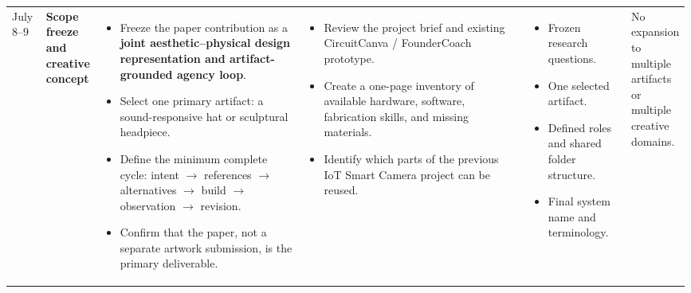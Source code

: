 \documentclass{article}
\begin{document}
\begin{landscape}
\begin{longtable}{
    L{0.05\linewidth}
    L{0.08\linewidth}
    L{0.3\linewidth}
    L{0.33\linewidth}
    L{0.15\linewidth}
    L{0.08\linewidth}
}
July 8--9
&
\textbf{Scope freeze and creative concept}
&
\begin{itemize}[leftmargin=*,nosep]
    \item Freeze the paper contribution as a
    \textbf{joint aesthetic--physical design representation and
    artifact-grounded agency loop}.
    \item Select one primary artifact:
    a sound-responsive hat or sculptural headpiece.
    \item Define the minimum complete cycle:
    intent $\rightarrow$ references $\rightarrow$ alternatives
    $\rightarrow$ build $\rightarrow$ observation $\rightarrow$ revision.
    \item Confirm that the paper, not a separate artwork submission,
    is the primary deliverable.
\end{itemize}
&
\begin{itemize}[leftmargin=*,nosep]
    \item Review the project brief and existing CircuitCanva /
    FounderCoach prototype.
    \item Create a one-page inventory of available hardware,
    software, fabrication skills, and missing materials.
    \item Identify which parts of the previous IoT Smart Camera
    project can be reused.
\end{itemize}
&
\begin{itemize}[leftmargin=*,nosep]
    \item Frozen research questions.
    \item One selected artifact.
    \item Defined roles and shared folder structure.
    \item Final system name and terminology.
\end{itemize}
&
No expansion to multiple artifacts or multiple creative domains.
\\


\end{longtable}
\end{landscape}
\end{document}
